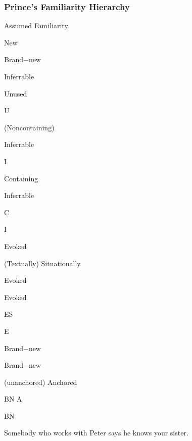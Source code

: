 \documentclass[compress,color=usenames]{beamer}
\begin{document}
\begin{frame}
\frametitle{
Prince's Familiarity Hierarchy}



Assumed Familiarity






New






Brand$-$new






Inferrable






Unused



U






(Noncontaining)



Inferrable



I






Containing



Inferrable



C



I






Evoked






(Textually) Situationally



Evoked



Evoked



ES



E






Brand$-$new



Brand$-$new



(unanchored) Anchored



BN A



BN






Somebody who works with Peter says he knows your sister.










\end{frame}
\end{document}
